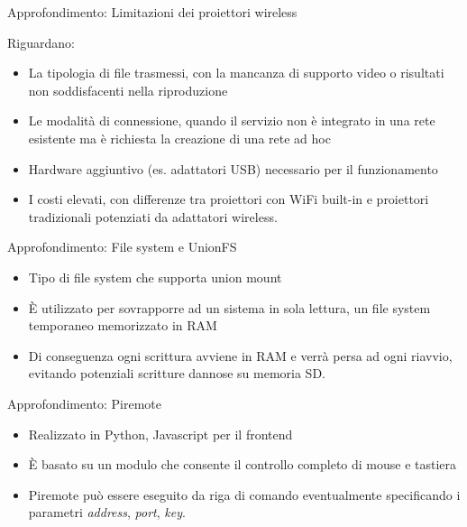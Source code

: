 \documentclass{beamer}
\begin{document}
\begin{frame}{Approfondimento: Limitazioni dei proiettori wireless}

Riguardano:\newline

\begin{itemize}

\item La tipologia di file trasmessi, con la mancanza di supporto video o risultati non soddisfacenti nella riproduzione
\item Le modalità di connessione, quando il servizio non è integrato in una rete esistente ma è richiesta la creazione di una rete ad hoc
\item Hardware aggiuntivo (es. adattatori USB) necessario per il funzionamento
\item I costi elevati, con differenze tra proiettori con WiFi built-in e proiettori tradizionali potenziati da adattatori wireless.

\end{itemize}
\end{frame}



\begin{frame}{Approfondimento: File system e UnionFS}

\begin{itemize}
\item Tipo di file system che supporta union mount
\item È utilizzato per sovrapporre ad un sistema in sola lettura, un file system temporaneo memorizzato in RAM
\item Di conseguenza ogni scrittura avviene in RAM e verrà persa ad ogni riavvio, evitando potenziali scritture dannose su memoria SD.
\end{itemize}
\end{frame}

\begin{frame}{Approfondimento: Piremote}

\begin{itemize}

\item Realizzato in Python, Javascript per il frontend
\item È basato su un modulo che consente il controllo completo di mouse e tastiera
\item Piremote può essere eseguito da riga di comando eventualmente specificando i parametri \textit{address}, \textit{port}, \textit{key}.

\end{itemize}

\end{frame}
\end{document}
